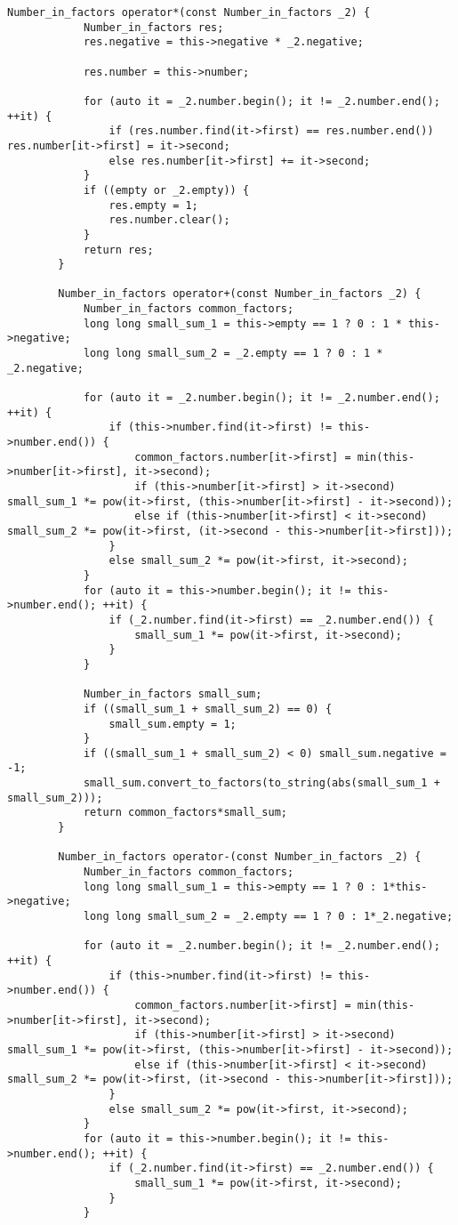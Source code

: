 \begin{lstlisting}[label = list1, caption = Программная реализация описанных алгоритмов]
		Number_in_factors operator*(const Number_in_factors _2) {
			Number_in_factors res;
			res.negative = this->negative * _2.negative;
			
			res.number = this->number;
			
			for (auto it = _2.number.begin(); it != _2.number.end(); ++it) {
				if (res.number.find(it->first) == res.number.end()) res.number[it->first] = it->second;
				else res.number[it->first] += it->second;
			}
			if ((empty or _2.empty)) {
				res.empty = 1;
				res.number.clear();
			}
			return res;
		}
		
		Number_in_factors operator+(const Number_in_factors _2) {
			Number_in_factors common_factors;
			long long small_sum_1 = this->empty == 1 ? 0 : 1 * this->negative;
			long long small_sum_2 = _2.empty == 1 ? 0 : 1 * _2.negative;
			
			for (auto it = _2.number.begin(); it != _2.number.end(); ++it) {
				if (this->number.find(it->first) != this->number.end()) {
					common_factors.number[it->first] = min(this->number[it->first], it->second);
					if (this->number[it->first] > it->second) small_sum_1 *= pow(it->first, (this->number[it->first] - it->second));
					else if (this->number[it->first] < it->second) small_sum_2 *= pow(it->first, (it->second - this->number[it->first]));
				}
				else small_sum_2 *= pow(it->first, it->second);
			}
			for (auto it = this->number.begin(); it != this->number.end(); ++it) {
				if (_2.number.find(it->first) == _2.number.end()) {
					small_sum_1 *= pow(it->first, it->second);
				}
			}
			
			Number_in_factors small_sum;
			if ((small_sum_1 + small_sum_2) == 0) {
				small_sum.empty = 1;
			}
			if ((small_sum_1 + small_sum_2) < 0) small_sum.negative = -1;
			small_sum.convert_to_factors(to_string(abs(small_sum_1 + small_sum_2)));
			return common_factors*small_sum;
		}
		
		Number_in_factors operator-(const Number_in_factors _2) {
			Number_in_factors common_factors;
			long long small_sum_1 = this->empty == 1 ? 0 : 1*this->negative;
			long long small_sum_2 = _2.empty == 1 ? 0 : 1*_2.negative;
			
			for (auto it = _2.number.begin(); it != _2.number.end(); ++it) {
				if (this->number.find(it->first) != this->number.end()) {
					common_factors.number[it->first] = min(this->number[it->first], it->second);
					if (this->number[it->first] > it->second) small_sum_1 *= pow(it->first, (this->number[it->first] - it->second));
					else if (this->number[it->first] < it->second) small_sum_2 *= pow(it->first, (it->second - this->number[it->first]));
				}
				else small_sum_2 *= pow(it->first, it->second);
			}
			for (auto it = this->number.begin(); it != this->number.end(); ++it) {
				if (_2.number.find(it->first) == _2.number.end()) {
					small_sum_1 *= pow(it->first, it->second);
				}
			}
			

\end{lstlisting}
